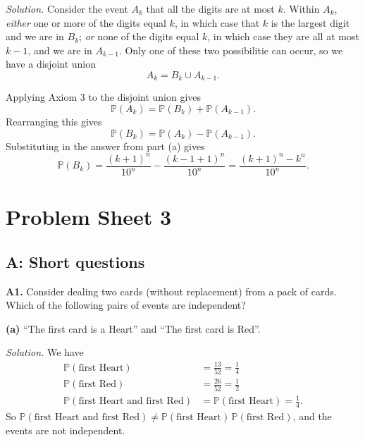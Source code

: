 \documentclass[
  a4paper,
]{book}
\theoremstyle{definition}
\theoremstyle{definition}
\theoremstyle{definition}
\theoremstyle{definition}
\theoremstyle{remark}
\begin{document}
\begin{myanswers}
\emph{Solution.}
Consider the event \(A_k\) that all the digits are at most \(k\). Within \(A_k\), \emph{either} one or more of the digits equal \(k\), in which case that \(k\) is the largest digit and we are in \(B_k\); \emph{or} none of the digits equal \(k\), in which case they are all at most \(k-1\), and we are in \(A_{k-1}\). Only one of these two possibilitie can occur, so we have a disjoint union
\[ A_k = B_k \cup A_{k-1} . \]

Applying Axiom 3 to the disjoint union gives
\[ \mathbb P(A_k) = \mathbb P(B_k) + \mathbb P(A_{k-1}) . \]
Rearranging this gives
\[ \mathbb P(B_k) = \mathbb P(A_k) - \mathbb P(A_{k-1}) . \]
Substituting in the answer from part (a) gives
\[\mathbb P(B_k) = \frac{(k+1)^n}{10^n} - \frac{(k-1+1)^n}{10^n} = \frac{(k+1)^n - k^n}{10^n} . \]

\end{myanswers}

\hypertarget{P3-solutions}{%
\section*{Problem Sheet 3}\label{P3-solutions}}

\hypertarget{P3-short-solutions}{%
\subsection*{A: Short questions}\label{P3-short-solutions}}

\textbf{A1.} Consider dealing two cards (without replacement) from a pack of cards. Which of the following pairs of events are independent?

\textbf{(a)} ``The first card is a Heart'' and ``The first card is Red''.

\begin{myanswers}
\emph{Solution.}
We have
\begin{align*}
\mathbb P(\text{first Heart}) &= \frac{13}{52} = \frac14 \\
\mathbb P(\text{first Red}) &= \frac{26}{52} = \frac12 \\
\mathbb P(\text{first Heart and first Red}) &= \mathbb P(\text{first Heart}) = \frac14 .
\end{align*}
So \(\mathbb P(\text{first Heart and first Red}) \neq \mathbb P(\text{first Heart})\,\mathbb P(\text{first Red})\), and the events are not independent.

\end{myanswers}
\end{document}
